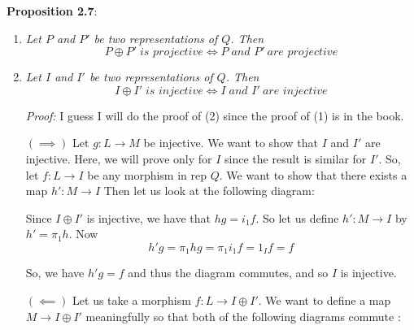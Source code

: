 \documentclass[12pt]{article}
\begin{document}
 \textbf{Proposition 2.7}:
 \begin{enumerate}
 \item \textit{Let $P$ and $P'$ be two representations of $Q$. Then} 
 \[
 P \oplus P' \; \textit{is projective} \iff P \; \textit{and } P' \: \textit{are projective}
 \]
 \item \textit{Let $I$ and $I'$ be two representations of $Q$. Then} 
 \[
 I \oplus I' \; \textit{is injective} \iff I \; \textit{and } I' \: \textit{are injective}
 \]

 \textit{Proof: } I guess I will do the proof of (2) since the proof of (1) is in the book.

 $(\implies)$ Let $g:L \to M$ be injective. We want to show that $I$ and $I'$ are injective. Here, we will prove only for $I$ since the result is similar for $I'$. So, let $f:L \to I$ be any morphism in rep $Q$. We want to show that there exists a map $h':M \to I$ Then let us look at the following diagram: 
\begin{center}
\end{center}
Since $I \oplus I'$ is injective, we have that $hg=i_1f$. So let us define $h' : M \to I $ by $h'=\pi_1h$. Now 
\[
h'g=\pi_1hg=\pi_1i_1f=1_If=f
\]

So, we have $h'g=f$ and thus the diagram commutes, and so $I$ is injective. 

$(\impliedby)$ Let us take a morphism $f:L  \to I \oplus I'$. We want to define a map $M\to I\oplus I'$ meaningfully so that both of the following diagrams commute : 
\begin{center}
\begin{minipage}{0.45\textwidth}
\centering
{}
\end{minipage}
\hfill
\begin{minipage}{0.45\textwidth}
\centering
{}
\end{minipage}
\end{center}


\end{enumerate}
\end{document}
